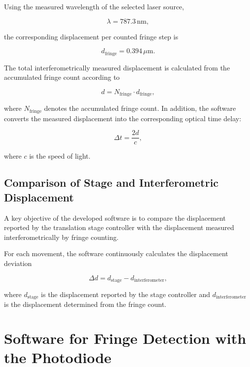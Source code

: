 Using the measured wavelength of the selected laser source,

\begin{equation}
\lambda = 787.3\,\mathrm{nm},
\end{equation}

the corresponding displacement per counted fringe step is

\begin{equation}
d_{\mathrm{fringe}}
=
0.394\,\mu\mathrm{m}.
\end{equation}

The total interferometrically measured displacement is calculated from the accumulated fringe count according to

\begin{equation}
d
=
N_{\mathrm{fringe}}
\cdot
d_{\mathrm{fringe}},
\end{equation}

where \(N_{\mathrm{fringe}}\) denotes the accumulated fringe count. In addition, the software converts the measured displacement into the corresponding optical time delay:

\begin{equation}
\Delta t
=
\frac{2d}{c},
\end{equation}

where \(c\) is the speed of light.

\subsection{Comparison of Stage and Interferometric Displacement}

A key objective of the developed software is to compare the displacement reported by the translation stage controller with the displacement measured interferometrically by fringe counting.

For each movement, the software continuously calculates the displacement deviation

\begin{equation}
\Delta d
=
d_{\mathrm{stage}}
-
d_{\mathrm{interferometer}},
\end{equation}

where \(d_{\mathrm{stage}}\) is the displacement reported by the stage controller and \(d_{\mathrm{interferometer}}\) is the displacement determined from the fringe count.

\section{Software for Fringe Detection with the Photodiode}

